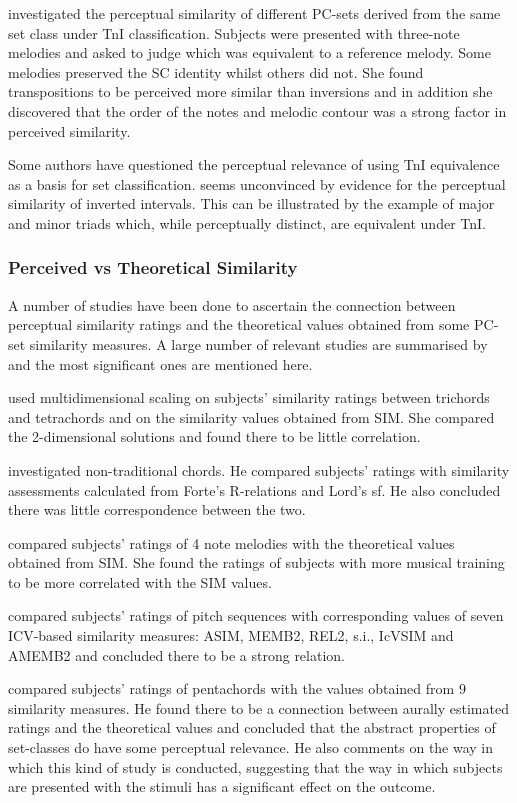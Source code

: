 \documentclass{article}
\begin{document}
\citet{Millar1984} investigated the perceptual similarity of different
PC-sets derived from the same set class under TnI
classification. Subjects were presented with three-note melodies and
asked to judge which was equivalent to a reference melody. Some
melodies preserved the SC identity whilst others did not. She found
transpositions to be perceived more similar than inversions and in
addition she discovered that the order of the notes and melodic
contour was a strong factor in perceived similarity.

Some authors have questioned the perceptual relevance of using TnI
equivalence as a basis for set classification. \citet{Deutsch1982}
seems unconvinced by evidence for the perceptual similarity of
inverted intervals. This can be illustrated by the example of major
and minor triads which, while perceptually distinct, are equivalent
under TnI.
\subsubsection{Perceived vs Theoretical Similarity}
\label{sec-3-5-3}

A number of studies have been done to ascertain the connection between
perceptual similarity ratings and the theoretical values obtained from
some PC-set similarity measures. A large number of relevant studies
are summarised by \citet{Kuusi2001} and the most significant ones are
mentioned here.

\citet{Bruner1984} used multidimensional scaling on subjects'
similarity ratings between trichords and tetrachords and on the
similarity values obtained from SIM. She compared the 2-dimensional
solutions and found there to be little correlation.

\citet{Gibson1986} investigated non-traditional chords. He compared
subjects' ratings with similarity assessments calculated from Forte's
R-relations and Lord's sf. He also concluded there was little
correspondence between the two.

\citet{Stammers1994} compared subjects' ratings of 4 note melodies with
the theoretical values obtained from SIM. She found the ratings of
subjects with more musical training to be more correlated with the SIM
values.

\citet{Lane1997} compared subjects' ratings of pitch sequences with
corresponding values of seven ICV-based similarity measures: ASIM,
MEMB2, REL2, s.i., IcVSIM and AMEMB2 and concluded there to be a
strong relation.

\citet{Kuusi2001} compared subjects' ratings of pentachords with the
values obtained from 9 similarity measures. He found there to be a
connection between aurally estimated ratings and the theoretical
values and concluded that the abstract properties of set-classes do
have some perceptual relevance. He also comments on the way in which
this kind of study is conducted, suggesting that the way in which
subjects are presented with the stimuli has a significant effect on
the outcome.
\end{document}
